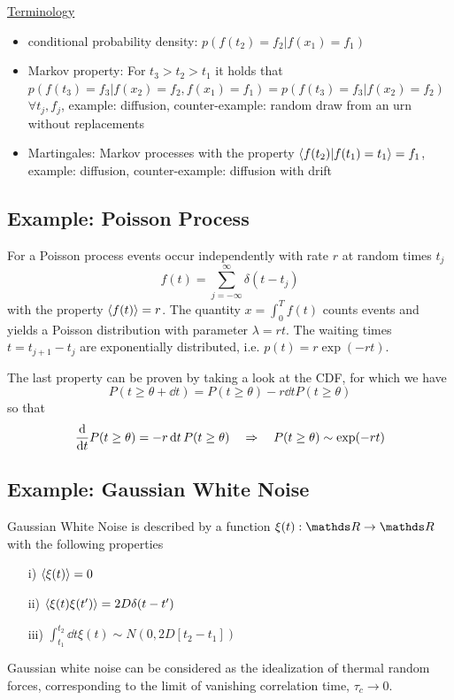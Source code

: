 \documentclass{notebook}
\begin{document}
\underline{Terminology}

\begin{itemize}
	\item{conditional probability density: $p(f(t_2) = f_2 | f(x_1) = f_1)$}
	\item{Markov property: For $t_3 > t_2 > t_1$ it holds that $p(f(t_3) = f_3 | f(x_2) = f_2, f(x_1)=f_1) = p(f(t_3) = f_3 | f(x_2) = f_2)$ $\forall t_j, f_j$, example: diffusion, counter-example: random draw from an urn without replacements}
	\item{Martingales: Markov processes with the property $\expval{f(t_2) | f(t_1) = t_1} = f_1$, example: diffusion, counter-example: diffusion with drift}
\end{itemize}

\subsection*{Example: Poisson Process}
%
\begin{theorem}
	For a Poisson process events occur independently with rate $r$ at random times $t_j$
	\begin{equation}
	f(t) = \sum_{j = -\infty}^{\infty}{\delta(t-t_j)}
	\end{equation}
	with the property $\expval{f(t)} = r$. The quantity $x = \int_0^T f(t) $ counts events and yields a Poisson distribution with parameter $\lambda = rt$. The waiting times $t = t_{j+1} - t_j$ are exponentially distributed, i.e. $p(t) = r \exp(-rt)$. 
\end{theorem}
%
The last property can be proven by taking a look at the CDF, for which we have 
%
\begin{equation*}
	P(t \geq \theta + \dd{t}) = P(t \geq \theta) - r \dd{t} P(t \geq \theta)
\end{equation*}
%
so that
%
\begin{equation*}
	\dv{t} P(t \geq \theta) = - r \dd{t} P(t \geq \theta)  \quad \Rightarrow \quad P(t \geq \theta) \sim \exp(-r t)
\end{equation*}
%


\subsection*{Example: Gaussian White Noise}

%
\begin{theorem}
	Gaussian White Noise is described by a function $\xi(t):\R \to \R$ with the following properties
	\begin{itemize}
		\item[i)]{$\expval{\xi(t)} = 0$}
		\item[ii)]{$\expval{\xi(t) \xi(t')} = 2D \delta(t-t')$}
		\item[iii)]{$\int_{t_1}^{t_2} \dd{t} \xi(t) \sim N(0,2D[t_2-t_1])$}
	\end{itemize}
	Gaussian white noise can be considered as the idealization of thermal random forces, corresponding to the limit of vanishing correlation time, $\tau_c \to 0$.
\end{theorem}
%
\end{document}
